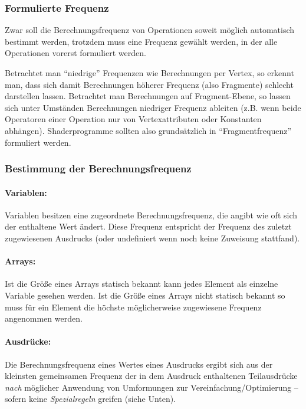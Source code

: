 \documentclass[twoside,a4paper,fleqn,12pt]{article}
\begin{document}
\subsubsection{Formulierte Frequenz}

Zwar soll die Berechnungsfrequenz von Operationen soweit möglich automatisch bestimmt werden, trotzdem muss eine Frequenz
gewählt werden, in der alle Operationen vorerst formuliert werden.

Betrachtet man "`niedrige"' Frequenzen wie Berechnungen per Vertex, so erkennt man, dass sich damit Berechnungen höherer
Frequenz (also Fragmente) schlecht darstellen lassen. Betrachtet man Berechnungen auf Fragment-Ebene, so lassen sich
unter Umständen Berechnungen niedriger Frequenz ableiten (z.B. wenn beide Operatoren einer Operation nur von Vertexattributen
oder Konstanten abhängen). Shaderprogramme sollten also grundsätzlich in "`Fragmentfrequenz"' formuliert werden.

\subsubsection{Bestimmung der Berechnungsfrequenz}

\paragraph{Variablen:} Variablen besitzen eine zugeordnete Berechnungsfrequenz, die angibt wie oft sich der enthaltene Wert ändert.
Diese Frequenz entspricht der Frequenz des zuletzt zugewiesenen Ausdrucks (oder undefiniert wenn noch keine Zuweisung stattfand).

\paragraph{Arrays:} Ist die Größe eines Arrays statisch bekannt kann jedes Element als einzelne Variable gesehen werden.
Ist die Größe eines Arrays nicht statisch bekannt so muss für ein Element die höchste möglicherweise zugewiesene
Frequenz angenommen werden.

\paragraph{Ausdrücke:} Die Berechnungsfrequenz eines Wertes eines Ausdrucks ergibt sich aus der kleinsten gemeinsamen Frequenz
der in dem Ausdruck enthaltenen Teilausdrücke \emph{nach} möglicher Anwendung von Umformungen zur Vereinfachung/Optimierung --
sofern keine \emph{Spezialregeln} greifen (siehe Unten).
\end{document}
